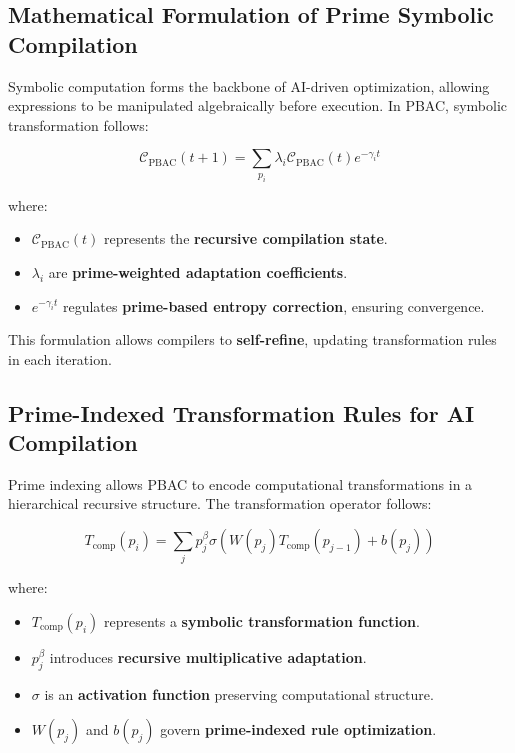 \documentclass{article}
\theoremstyle{plain}
\theoremstyle{plain}
\theoremstyle{definition}
\theoremstyle{remark}
\begin{document}
\subsection{Mathematical Formulation of Prime Symbolic Compilation}

Symbolic computation forms the backbone of AI-driven optimization, allowing expressions to be manipulated algebraically before execution. In PBAC, symbolic transformation follows:

\begin{equation}
\mathcal{C}_{\text{PBAC}}(t+1) = \sum_{p_i} \lambda_i \mathcal{C}_{\text{PBAC}}(t) e^{-\gamma_i t}
\end{equation}

where:
\begin{itemize}
    \item $\mathcal{C}_{\text{PBAC}}(t)$ represents the \textbf{recursive compilation state}.
    \item $\lambda_i$ are \textbf{prime-weighted adaptation coefficients}.
    \item $e^{-\gamma_i t}$ regulates \textbf{prime-based entropy correction}, ensuring convergence.
\end{itemize}

This formulation allows compilers to \textbf{self-refine}, updating transformation rules in each iteration.

\subsection{Prime-Indexed Transformation Rules for AI Compilation}

Prime indexing allows PBAC to encode computational transformations in a hierarchical recursive structure. The transformation operator follows:

\begin{equation}
T_{\text{comp}}(p_i) = \sum_{j} p_j^{\beta} \sigma (W(p_j) T_{\text{comp}}(p_{j-1}) + b(p_j))
\end{equation}

where:
\begin{itemize}
    \item $T_{\text{comp}}(p_i)$ represents a \textbf{symbolic transformation function}.
    \item $p_j^{\beta}$ introduces \textbf{recursive multiplicative adaptation}.
    \item $\sigma$ is an \textbf{activation function} preserving computational structure.
    \item $W(p_j)$ and $b(p_j)$ govern \textbf{prime-indexed rule optimization}.
\end{itemize}
\end{document}
